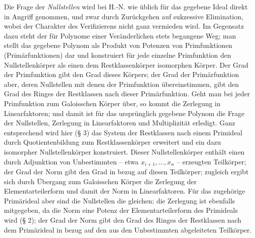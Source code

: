 \documentclass[11pt]{article}
\begin{document}
Die Frage der \emph{Nullstellen} wird bei H.-N. wie üblich für das gegebene Ideal direkt in Angriff genommen, und zwar durch Zurückgehen auf sukzessive Elimination, wobei der Charakter des Verifizierens nicht ganz vermieden wird. Im Gegensatz dazu steht der für Polynome einer Veränderlichen stets begangene Weg; man stellt das gegebene Polynom als Produkt von Potenzen von Primfunktionen (Primärfunktionen) dar und konstruiert für jede einzelne Primfunktion den Nullstellenkörper als einen dem Restklassenkörper isomorphen Körper. Der Grad der Primfunktion gibt den Grad dieses Körpers; der Grad der Primärfunktion aber, deren Nullstellen mit denen der Primfunktion übereinstimmen, gibt den Grad des Ringes der Restklassen nach dieser Primärfunktion. Geht man bei jeder Primfunktion zum Galoisschen Körper über, so kommt die Zerlegung in Linearfaktoren; und damit ist für das ursprünglich gegebene Polynom die Frage der Nullstellen, Zerlegung in Linearfaktoren und Multiplizität erledigt. Ganz entsprechend wird hier (§ 3) das System der Restklassen nach einem Primideal durch Quotientenbildung zum Restklassenkörper erweitert und ein dazu isomorpher Nullstellenkörper konstruiert. Dieser Nullstellenkörper enthält einen durch Adjunktion von Unbestimmten -- etwa $x_{i+1},\ldots,x_n$ -- erzeugten Teilkörper; der Grad der Norm gibt den Grad in bezug auf diesen Teilkörper; zugleich ergibt sich durch Übergang zum Galoisschen Körper die Zerlegung der Elementarteilerform und damit der Norm in Linearfaktoren. Für das zugehörige Primärideal aber sind die Nullstellen die gleichen; die Zerlegung ist ebenfalls mitgegeben, da die Norm eine Potenz der Elementarteilerform des Primideals wird (§ 2); der Grad der Norm gibt den Grad des Ringes der Restklassen nach dem Primärideal in bezug auf den aus den Unbestimmten abgeleiteten Teilkörper.
\end{document}

